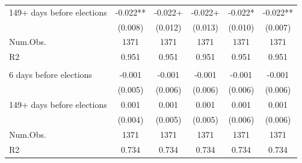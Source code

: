 \begin{tabular}[t]{lccccc}
\hspace{1em}149+ days before elections & -0.022** & -0.022+ & -0.022+ & -0.022* & -0.022**\\
\hspace{1em} & (0.008) & (0.012) & (0.013) & (0.010) & (0.007)\\
\hspace{1em}Num.Obs. & 1371 & 1371 & 1371 & 1371 & \vphantom{1} 1371\\
\hspace{1em}R2 & 0.951 & 0.951 & 0.951 & 0.951 & 0.951\\
\addlinespace[0.5cm]
\multicolumn{6}{l}{Panel D: Turnout}\\
\hspace{1em}6 days before elections & -0.001 & -0.001 & -0.001 & -0.001 & -0.001\\
\hspace{1em} & (0.005) & (0.006) & (0.006) & (0.006) & (0.006)\\
\hspace{1em}149+ days before elections & 0.001 & 0.001 & 0.001 & 0.001 & 0.001\\
\hspace{1em} & (0.004) & (0.005) & (0.005) & (0.006) & (0.006)\\
\hspace{1em}Num.Obs. & 1371 & 1371 & 1371 & 1371 & 1371\\
\hspace{1em}R2 & 0.734 & 0.734 & 0.734 & 0.734 & 0.734\\
\bottomrule
\end{tabular}
